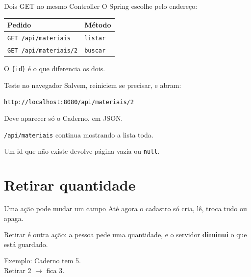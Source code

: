 \documentclass[aspectratio=169,11pt]{beamer}
\begin{document}
\begin{frame}{Dois GET no mesmo Controller}
  O Spring escolhe pelo endereço:

  \vspace{0.4em}
  \begin{center}
  \begin{tabular}{ll}
    \toprule
    Pedido & Método \\
    \midrule
    \texttt{GET /api/materiais} & \texttt{listar} \\
    \texttt{GET /api/materiais/2} & \texttt{buscar} \\
    \bottomrule
  \end{tabular}
  \end{center}

  \vspace{0.5em}
  O \texttt{\{id\}} é o que diferencia os dois.
\end{frame}

\begin{frame}{Teste no navegador}
  Salvem, reiniciem se precisar, e abram:

  \vspace{0.4em}
  \texttt{http://localhost:8080/api/materiais/2}

  \vspace{0.5em}
  Deve aparecer só o Caderno, em JSON.

  \vspace{0.4em}
  \texttt{/api/materiais} continua mostrando a lista toda.

  \vspace{0.5em}
  Um id que não existe devolve página vazia ou \texttt{null}.
\end{frame}

\section{Retirar quantidade}

\begin{frame}{Uma ação pode mudar um campo}
  Até agora o cadastro só cria, lê, troca tudo ou apaga.

  \vspace{0.5em}
  Retirar é outra ação: a pessoa pede uma quantidade,
  e o servidor \textbf{diminui} o que está guardado.

  \vspace{0.5em}
  Exemplo: Caderno tem 5.\\
  Retirar 2 $\rightarrow$ fica 3.
\end{frame}
\end{document}

